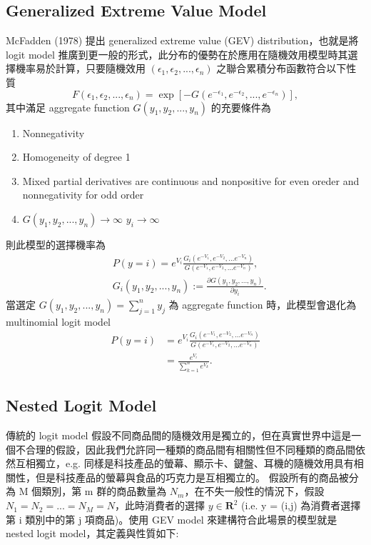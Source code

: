 \documentclass[12pt]{article}
\theoremstyle{definition}
\begin{document}
\begin{sloppypar}
\subsection{Generalized Extreme Value Model}
McFadden (1978) 提出 generalized extreme value (GEV) distribution，也就是將 logit model 推廣到更一般的形式，此分布的優勢在於應用在隨機效用模型時其選擇機率易於計算，只要隨機效用 $(\epsilon_{1}, \epsilon_{2}, ..., \epsilon_{n})$ 之聯合累積分布函數符合以下性質
\begin{equation}
    F(\epsilon_{1}, \epsilon_{2}, ..., \epsilon_{n}) = \exp[-G(e^{-\epsilon_{1}}, e^{-\epsilon_{2}}, ..., e^{-\epsilon_{n}})],
\end{equation}
其中滿足 aggregate function $G(y_1, y_2, ..., y_n)$ 的充要條件為
\begin{enumerate}
    \item Nonnegativity
    \item Homogeneity of degree 1
    \item Mixed partial derivatives are continuous and nonpositive for even oreder and nonnegativity for odd order
    \item  $G(y_1, y_2, ..., y_n) \rightarrow \infty$  $y_i \rightarrow \infty$
\end{enumerate}
則此模型的選擇機率為
\begin{align}\label{eqn:the property of GEV model}
    &P(y=i) = e^{V_{i}}\frac{G_i(e^{-V_1},e^{-V_2},...e^{-V_n})}{G(e^{-V_1},e^{-V_2},...e^{-V_n})},\\
    &G_i(y_1, y_2, ..., y_n) := \frac{\partial G(y_1, y_2, ..., y_n)}{\partial y_i}. \nonumber
\end{align}
當選定 $G(y_1, y_2, ..., y_n)=\sum_{j=1}^{n} y_j$ 為 aggregate function 時，此模型會退化為 multinomial logit model
\begin{align*}
    P(y=i) &= e^{V_{i}}\frac{G_i(e^{-V_1},e^{-V_2},...e^{-V_n})}{G(e^{-V_1},e^{-V_2},...e^{-V_n})}\\
    &= \frac{e^{V_{i}}}{\sum_{k=1}^{n} e^{V_{k}}}.
\end{align*}
\subsection{Nested Logit Model}
傳統的 logit model 假設不同商品間的隨機效用是獨立的，但在真實世界中這是一個不合理的假設，因此我們允許同一種類的商品間有相關性但不同種類的商品間依然互相獨立，e.g. 同樣是科技產品的螢幕、顯示卡、鍵盤、耳機的隨機效用具有相關性，但是科技產品的螢幕與食品的巧克力是互相獨立的。\newline
\indent 假設所有的商品被分為 M 個類別，第 m 群的商品數量為 $N_m$，在不失一般性的情況下，假設 $N_1 = N_2 = ... = N_M = N$，此時消費者的選擇 $y \in \textbf{R}^2$ (i.e. y = (i,j) 為消費者選擇第 i 類別中的第 j 項商品)。使用 GEV model 來建構符合此場景的模型就是 nested logit model，其定義與性質如下:


\end{sloppypar}
\end{document}
